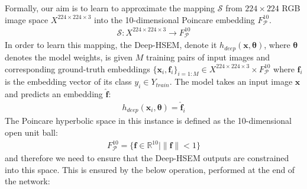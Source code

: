 \documentclass[12pt]{report}
\begin{document}
Formally, our aim is to learn to approximate the mapping $\mathcal{S}$ from $224\times224$ RGB image space $X^{224 \times 224 \times 3}$ into the 10-dimensional Poincare embedding $F_{\mathcal{P}}^{10}$.
\begin{align*}
\mathcal{S}: X^{224 \times 224 \times 3} \rightarrow F_{\mathcal{P}}^{10}
\end{align*}
In order to learn this mapping, the Deep-HSEM, denote it $h_{deep}(\mathbf{x}, \pmb{\theta})$, where $\pmb{\theta}$ denotes the model weights, is given $M$ training pairs of input images and corresponding ground-truth embeddings $\{\mathbf{x}_i, \mathbf{f}_i\}_{i=1:M} \in X^{224\times224\times3} \times F_{\mathcal{P}}^{10}$ where $\mathbf{f}_i$ is the embedding vector of its class $y_i \in Y_{train}$. The model takes an input image $\mathbf{x}$ and predicts an embedding $\hat{\mathbf{f}}$:
\begin{align*}
  h_{deep}(\mathbf{x}_i, \pmb{\theta}) = \hat{\mathbf{f}}_i
\end{align*}
The Poincare hyperbolic space in this instance is defined as the 10-dimensional open unit ball:
\begin{align*}
  F_{\mathcal{P}}^{10}=\{\mathbf{f} \in \mathbb{R}^{10} | \lVert \mathbf{f} \rVert <1 \}
\end{align*}
and therefore we need to ensure that the Deep-HSEM outputs are constrained into this space. This is ensured by the below operation, performed at the end of the network:
\end{document}
